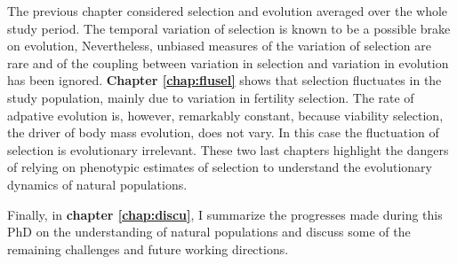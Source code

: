 The previous chapter considered selection and evolution averaged over the whole study period. The temporal variation of selection is known to be a possible brake on evolution, 
Nevertheless, unbiased measures of the variation of selection are rare and of the coupling between variation in selection and variation in evolution has been ignored. \textbf{Chapter \ref{chap:flusel}} shows that selection fluctuates in the study population, mainly due to variation in fertility selection. The rate of adpative evolution is, however, remarkably constant, because viability selection, the driver of body mass evolution, does not vary. In this case the fluctuation of selection is evolutionary irrelevant. These two last chapters highlight the dangers of relying on phenotypic estimates of selection to understand the evolutionary dynamics of natural populations.

Finally, in \textbf{chapter \ref{chap:discu}}, I summarize the progresses made during this PhD on the understanding of natural populations and discuss some of the remaining challenges and future working directions.

\printbibliography[heading=subbibliography]

